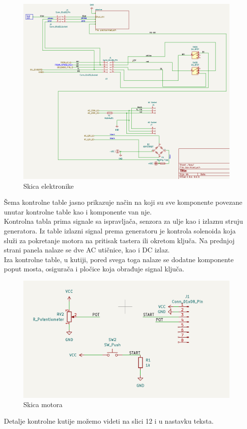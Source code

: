 \documentclass[a4paper, 11pt, titlepage]{article}
\begin{document}
\begin{figure}[htbp]
    \centering
    \includegraphics[width=0.75\linewidth]{elektronika.png}
    \caption{Skica elektronike}
\end{figure}

Šema kontrolne table jasno prikazuje način na koji su sve komponente povezane unutar kontrolne table kao i komponente van nje. \\

Kontrolna tabla prima signale sa ispravljača, senzora za ulje kao i izlaznu struju generatora. Iz table izlazni signal prema generatoru je kontrola solenoida koja služi za pokretanje motora na pritisak tastera ili okretom ključa. Na prednjoj strani panela nalaze se dve AC utičnice, kao i DC izlaz. \\

Iza kontrolne table, u kutiji, pored svega toga nalaze se dodatne komponente poput mosta, osigurača i pločice koja obrađuje signal ključa. \\




\begin{figure}[htbp]
    \centering
    \includegraphics[width=1\linewidth]{kontrolna_plocica.png}
    \caption{Skica motora}
\end{figure}
Detalje kontrolne kutije možemo videti na slici 12 i u nastavku teksta. 
\end{document}
